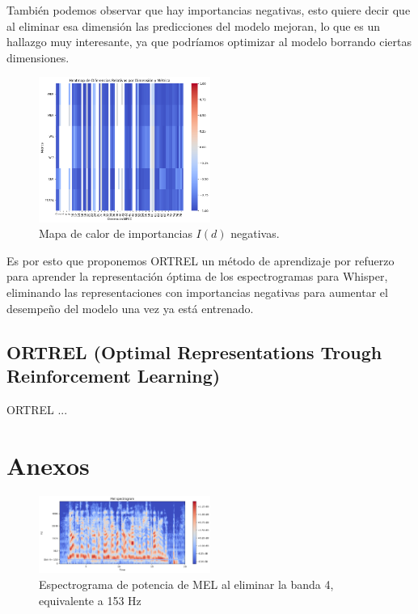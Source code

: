 \documentclass[conference]{IEEEtran}
\begin{document}
También podemos observar que hay importancias negativas, esto quiere decir que al eliminar esa dimensión las predicciones del modelo mejoran, lo que es un hallazgo muy interesante, ya que podríamos optimizar al modelo borrando ciertas dimensiones.
\begin{figure}[H]
\centering
\includegraphics[width=0.5\textwidth]{images/negative_importance.png}
\caption{Mapa de calor de importancias $I(d)$ negativas.}
\label{fig:cv_imp_neg}
\end{figure}
Es por esto que proponemos ORTREL un método de aprendizaje por refuerzo para aprender la representación óptima de los espectrogramas para Whisper, eliminando las representaciones con importancias negativas para aumentar el desempeño del modelo una vez ya está entrenado.

\subsection{ORTREL (Optimal Representations Trough Reinforcement Learning)}
ORTREL ...

\printbibliography

\newpage

\section{Anexos} \label{Anexos}

\begin{figure}[ht]
\centering
\includegraphics[width=0.5\textwidth]{images/dim_4_erasured.png}
\caption{Espectrograma de potencia de MEL al eliminar la banda 4, equivalente a 153 Hz}
\end{figure}
\end{document}
